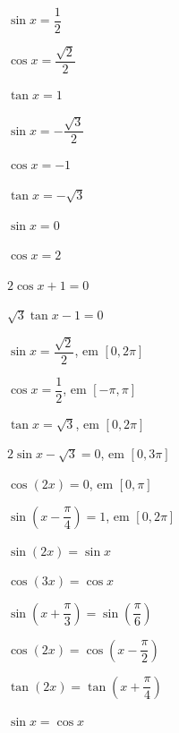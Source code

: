\documentclass[12pt]{article}
\begin{document}


\begin{exercicios}
  \item $\sin x = \dfrac{1}{2}$
  \item $\cos x = \dfrac{\sqrt{2}}{2}$
  \item $\tan x = 1$
  \item $\sin x = -\dfrac{\sqrt{3}}{2}$
  \item $\cos x = -1$
  \item $\tan x = -\sqrt{3}$
  \item $\sin x = 0$
  \item $\cos x = 2$
  \item $2\cos x + 1 = 0$
  \item $\sqrt{3}\tan x - 1 = 0$
\end{exercicios}

\begin{exercicios}
  \item $\sin x = \dfrac{\sqrt{2}}{2}$, \; em $[0, 2\pi]$
  \item $\cos x = \dfrac{1}{2}$, \; em $[-\pi, \pi]$
  \item $\tan x = \sqrt{3}$, \; em $[0, 2\pi]$
  \item $2\sin x - \sqrt{3} = 0$, \; em $[0, 3\pi]$
  \item $\cos(2x) = 0$, \; em $[0, \pi]$
  \item $\sin\left(x - \dfrac{\pi}{4}\right) = 1$, \; em $[0, 2\pi]$
\end{exercicios}

\begin{exercicios}
  \item $\sin(2x) = \sin x$
  \item $\cos(3x) = \cos x$
  \item $\sin\left(x + \dfrac{\pi}{3}\right) = \sin\left(\dfrac{\pi}{6}\right)$
  \item $\cos(2x) = \cos\left(x - \dfrac{\pi}{2}\right)$
  \item $\tan(2x) = \tan\left(x + \dfrac{\pi}{4}\right)$
  \item $\sin x = \cos x$
\end{exercicios}
\end{document}
